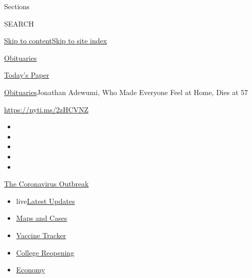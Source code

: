 Sections

SEARCH

\protect\hyperlink{site-content}{Skip to
content}\protect\hyperlink{site-index}{Skip to site index}

\href{https://www.nytimes.com/section/obituaries}{Obituaries}

\href{https://myaccount.nytimes.com/auth/login?response_type=cookie\&client_id=vi}{}

\href{https://www.nytimes.com/section/todayspaper}{Today's Paper}

\href{/section/obituaries}{Obituaries}\textbar{}Jonathan Adewumi, Who
Made Everyone Feel at Home, Dies at 57

\url{https://nyti.ms/2zHCVNZ}

\begin{itemize}
\item
\item
\item
\item
\item
\end{itemize}

\href{https://www.nytimes.com/news-event/coronavirus?action=click\&pgtype=Article\&state=default\&region=TOP_BANNER\&context=storylines_menu}{The
Coronavirus Outbreak}

\begin{itemize}
\tightlist
\item
  live\href{https://www.nytimes.com/2020/08/03/world/coronavirus-covid-19.html?action=click\&pgtype=Article\&state=default\&region=TOP_BANNER\&context=storylines_menu}{Latest
  Updates}
\item
  \href{https://www.nytimes.com/interactive/2020/us/coronavirus-us-cases.html?action=click\&pgtype=Article\&state=default\&region=TOP_BANNER\&context=storylines_menu}{Maps
  and Cases}
\item
  \href{https://www.nytimes.com/interactive/2020/science/coronavirus-vaccine-tracker.html?action=click\&pgtype=Article\&state=default\&region=TOP_BANNER\&context=storylines_menu}{Vaccine
  Tracker}
\item
  \href{https://www.nytimes.com/2020/08/02/us/covid-college-reopening.html?action=click\&pgtype=Article\&state=default\&region=TOP_BANNER\&context=storylines_menu}{College
  Reopening}
\item
  \href{https://www.nytimes.com/live/2020/08/03/business/stock-market-today-coronavirus?action=click\&pgtype=Article\&state=default\&region=TOP_BANNER\&context=storylines_menu}{Economy}
\end{itemize}

